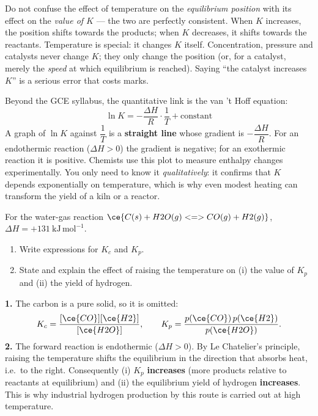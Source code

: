 \documentclass[11pt]{article}
\newcommand{\cle}[1]{{\popxbold\color{popdark}#1}}
\newcounter{popsec}
\newcounter{popsub}
\newcommand{\courssub}[1]{%
  \stepcounter{popsub}%
  \par\vspace{9pt}\noindent{\popxbold\fontsize{11.5}{13}\selectfont\color{popink}{\color{poporange}\thepopsec.\thepopsub}\hspace{6pt}#1}\par\nopagebreak\vspace{4pt}
}
\begin{document}
\begin{attention}
Do not confuse the effect of temperature on the \emph{equilibrium position} with its effect on the \emph{value of $K$} — the two are perfectly consistent. When $K$ increases, the position shifts towards the products; when $K$ decreases, it shifts towards the reactants. Temperature is special: it changes $K$ itself. Concentration, pressure and catalysts never change $K$; they only change the position (or, for a catalyst, merely the \emph{speed} at which equilibrium is reached). Saying ``the catalyst increases $K$'' is a serious error that costs marks.
\end{attention}

\courssub{The van 't Hoff Relationship (Extension)}

\begin{savaistu}
Beyond the GCE syllabus, the quantitative link is the \cle{van 't Hoff equation}:
\[
\ln K = -\frac{\Delta H}{R}\cdot\frac{1}{T} + \text{constant}
\]
A graph of $\ln K$ against $\dfrac{1}{T}$ is a \textbf{straight line} whose gradient is $-\dfrac{\Delta H}{R}$. For an endothermic reaction ($\Delta H > 0$) the gradient is negative; for an exothermic reaction it is positive. Chemists use this plot to measure enthalpy changes experimentally. You only need to know it \emph{qualitatively}: it confirms that $K$ depends exponentially on temperature, which is why even modest heating can transform the yield of a kiln or a reactor.
\end{savaistu}

\begin{exoresolu}
For the water-gas reaction $\ce{C(s) + H2O(g) <=> CO(g) + H2(g)}$, $\Delta H = +131\ \mathrm{kJ\,mol^{-1}}$.
\begin{enumerate}
\item Write expressions for $K_c$ and $K_p$.
\item State and explain the effect of raising the temperature on (i) the value of $K_p$ and (ii) the yield of hydrogen.
\end{enumerate}
\tcblower
\textbf{1.} The carbon is a pure solid, so it is omitted:
\[
K_c = \frac{[\ce{CO}][\ce{H2}]}{[\ce{H2O}]}, \qquad
K_p = \frac{p(\ce{CO})\,p(\ce{H2})}{p(\ce{H2O})}.
\]
\textbf{2.} The forward reaction is endothermic ($\Delta H > 0$). By Le Chatelier's principle, raising the temperature shifts the equilibrium in the direction that absorbs heat, i.e.\ to the right. Consequently (i) $K_p$ \textbf{increases} (more products relative to reactants at equilibrium) and (ii) the equilibrium yield of hydrogen \textbf{increases}. This is why industrial hydrogen production by this route is carried out at high temperature.
\end{exoresolu}
\end{document}
